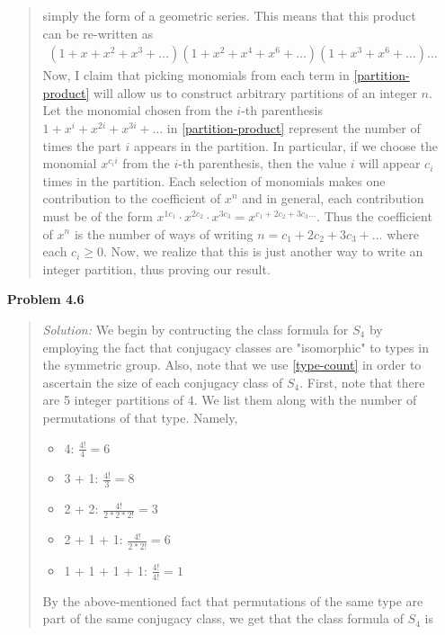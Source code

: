 \documentclass{article}
\newcommand{\Solution}{\textit{Solution: }}
\begin{document}
\begin{enumerate}
\begin{quote}
            simply the form of a geometric series. This means that this product can be re-written as 
            \begin{gather}\label{partition-product}
                (1 + x + x^2 + x^3 + \dots)(1 + x^2 + x^4 + x^6 + \dots)(1 + x^3 + x^6 + \dots)\dots
            \end{gather} Now, I claim that picking monomials from each term in \eqref{partition-product} will allow us to construct arbitrary partitions of an integer $n$. 
            Let the monomial chosen from the $i$-th parenthesis $1+x^i+x^{2i}+x^{3i}+\dots$ in \eqref{partition-product} represent the number of times the part $i$ appears in the partition. 
            In particular, if we choose the monomial $x^{c_ii}$ from the $i$-th parenthesis, then the value $i$ will appear $c_i$ times in the partition. Each selection of monomials makes one 
            contribution to the coefficient of $x^n$ and in general, each contribution must be of the form $x^{1c_1} \cdot x^{2c_2} \cdot x^{3c_3}= x^{c_1+2c_2+3c_3\dots}$. Thus the coefficient of
            $x^n$ is the number of ways of writing $n = c_1 + 2c_2 + 3c_3 +\dots$ where each $c_i \geq 0$. Now, we realize that this is just another way to write an integer partition, thus proving
            our result. \qedsymbol
        \end{quote}
        \item[\textbf{Problem 4.6}]
        \begin{quote}
            \Solution We begin by contructing the class formula for $S_4$ by employing the fact that conjugacy classes are "isomorphic" to types in the symmetric group. Also, note 
            that we use \eqref{type-count} in order to ascertain the size of each conjugacy class of $S_4$. First, note that there are 5 integer partitions of 4.
            We list them along with the number of permutations of that type.
            Namely,
            \begin{itemize}
                \item 4: $\frac{4!}{4} = 6$
                \item 3 + 1: $\frac{4!}{3} = 8$
                \item 2 + 2: $\frac{4!}{2*2*2!} = 3$
                \item 2 + 1 + 1: $\frac{4!}{2*2!} = 6$
                \item 1 + 1 + 1 + 1: $\frac{4!}{4!} = 1$
            \end{itemize} By the above-mentioned fact that permutations of the same type are part of the same conjugacy class, we get that the class formula of $S_4$ is 

\end{quote}
\end{enumerate}
\end{document}
